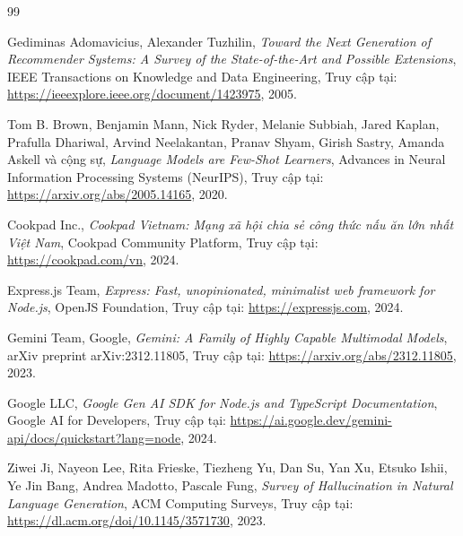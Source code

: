 
\cleardoublepage
{}
{}

\begin{thebibliography}{99}
\setlength{\itemsep}{3pt plus 1pt minus 1pt}
\setlength{\parskip}{0pt}

Gediminas Adomavicius, Alexander Tuzhilin, \textit{Toward the Next Generation of Recommender Systems: A Survey of the State-of-the-Art and Possible Extensions}, IEEE Transactions on Knowledge and Data Engineering, Truy cập tại: \url{https://ieeexplore.ieee.org/document/1423975}, 2005.

Tom B. Brown, Benjamin Mann, Nick Ryder, Melanie Subbiah, Jared Kaplan, Prafulla Dhariwal, Arvind Neelakantan, Pranav Shyam, Girish Sastry, Amanda Askell và cộng sự, \textit{Language Models are Few-Shot Learners}, Advances in Neural Information Processing Systems (NeurIPS), Truy cập tại: \url{https://arxiv.org/abs/2005.14165}, 2020.

Cookpad Inc., \textit{Cookpad Vietnam: Mạng xã hội chia sẻ công thức nấu ăn lớn nhất Việt Nam}, Cookpad Community Platform, Truy cập tại: \url{https://cookpad.com/vn}, 2024.

Express.js Team, \textit{Express: Fast, unopinionated, minimalist web framework for Node.js}, OpenJS Foundation, Truy cập tại: \url{https://expressjs.com}, 2024.

Gemini Team, Google, \textit{Gemini: A Family of Highly Capable Multimodal Models}, arXiv preprint arXiv:2312.11805, Truy cập tại: \url{https://arxiv.org/abs/2312.11805}, 2023.

Google LLC, \textit{Google Gen AI SDK for Node.js and TypeScript Documentation}, Google AI for Developers, Truy cập tại: \url{https://ai.google.dev/gemini-api/docs/quickstart?lang=node}, 2024.

Ziwei Ji, Nayeon Lee, Rita Frieske, Tiezheng Yu, Dan Su, Yan Xu, Etsuko Ishii, Ye Jin Bang, Andrea Madotto, Pascale Fung, \textit{Survey of Hallucination in Natural Language Generation}, ACM Computing Surveys, Truy cập tại: \url{https://dl.acm.org/doi/10.1145/3571730}, 2023.


\end{thebibliography}
